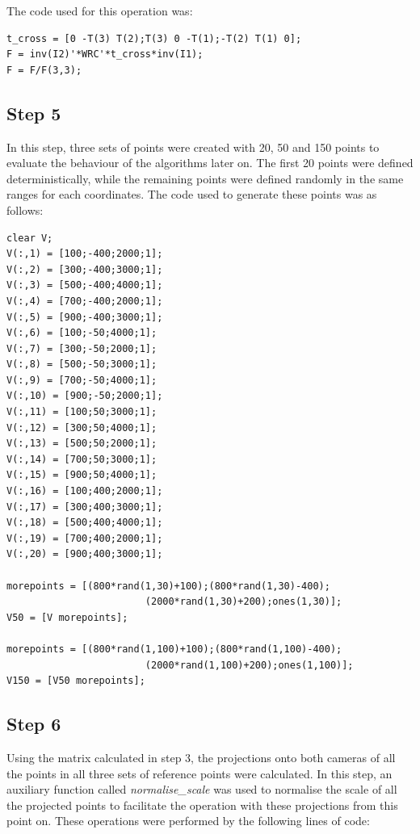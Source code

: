 \documentclass[peerreview,11pt]{IEEEtran}
\begin{document}
The code used for this operation was:

\begin{verbatim}
t_cross = [0 -T(3) T(2);T(3) 0 -T(1);-T(2) T(1) 0];
F = inv(I2)'*WRC'*t_cross*inv(I1);
F = F/F(3,3);
\end{verbatim}

\subsection{Step 5}


In this step, three sets of points were created with 20, 50 and 150 points to evaluate the behaviour of the algorithms later on. The first 20 points were defined deterministically, while the remaining points were defined randomly in the same ranges for each coordinates. The code used to generate these points was as follows:

\begin{verbatim}
clear V;
V(:,1) = [100;-400;2000;1];
V(:,2) = [300;-400;3000;1];
V(:,3) = [500;-400;4000;1];
V(:,4) = [700;-400;2000;1];
V(:,5) = [900;-400;3000;1];
V(:,6) = [100;-50;4000;1];
V(:,7) = [300;-50;2000;1];
V(:,8) = [500;-50;3000;1];
V(:,9) = [700;-50;4000;1];
V(:,10) = [900;-50;2000;1];
V(:,11) = [100;50;3000;1];
V(:,12) = [300;50;4000;1];
V(:,13) = [500;50;2000;1];
V(:,14) = [700;50;3000;1];
V(:,15) = [900;50;4000;1];
V(:,16) = [100;400;2000;1];
V(:,17) = [300;400;3000;1];
V(:,18) = [500;400;4000;1];
V(:,19) = [700;400;2000;1];
V(:,20) = [900;400;3000;1];

morepoints = [(800*rand(1,30)+100);(800*rand(1,30)-400);
                        (2000*rand(1,30)+200);ones(1,30)];
V50 = [V morepoints];

morepoints = [(800*rand(1,100)+100);(800*rand(1,100)-400);
                        (2000*rand(1,100)+200);ones(1,100)];
V150 = [V50 morepoints];
\end{verbatim}


\subsection{Step 6}

Using the matrix calculated in step 3, the projections onto both cameras of all the points in all three sets of reference points were calculated. In this step, an auxiliary function called \textit{normalise\_scale} was used to normalise the scale of all the projected points to facilitate the operation with these projections from this point on. These operations were performed by the following lines of code:
\end{document}
